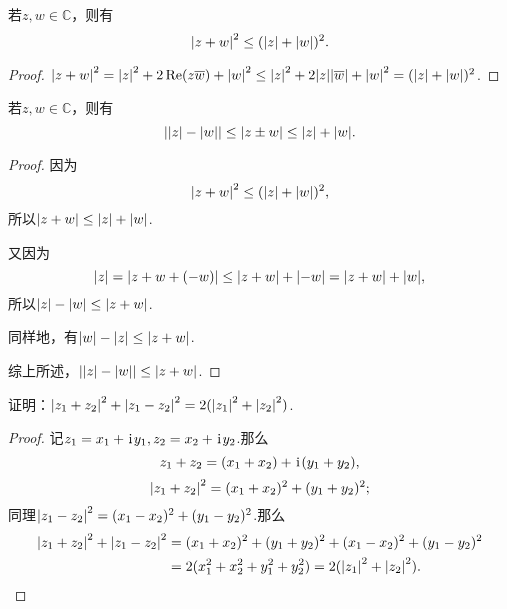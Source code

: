 \begin{theorem}
若\(z,w \in \mathbb{C}\)，则有\begin{equation}
\abs{z + w}^2 \leq (\abs{z} + \abs{w})^2.
\end{equation}
\begin{proof}
\(
\abs{z + w}^2
= \abs{z}^2 + 2 \Re(z \overline{w}) + \abs{w}^2
\leq \abs{z}^2 + 2 \abs{z}\abs{\overline{w}} + \abs{w}^2
= (\abs{z} + \abs{w})^2
\).
\end{proof}
\end{theorem}

\begin{theorem}[三角不等式]
若\(z,w \in \mathbb{C}\)，则有\begin{equation}
\abs{\abs{z}-\abs{w}} \leq \abs{z \pm w} \leq \abs{z} + \abs{w}.
\end{equation}
\begin{proof}
因为\begin{equation*}
\abs{z + w}^2 \leq (\abs{z} + \abs{w})^2,
\end{equation*}所以\(\abs{z + w} \leq \abs{z} + \abs{w}\).

又因为\begin{equation*}
\abs{z} = \abs{z + w + (-w)} \leq \abs{z+w} + \abs{-w} = \abs{z+w} + \abs{w},
\end{equation*}所以\(\abs{z}-\abs{w} \leq \abs{z+w}\).

同样地，有\(\abs{w}-\abs{z} \leq \abs{z+w}\).

综上所述，\(\abs{\abs{z}-\abs{w}}\leq\abs{z+w}\).
\end{proof}
\end{theorem}

\begin{example}
证明：\(\abs{z_1+z_2}^2 + \abs{z_1-z_2}^2 = 2 (\abs{z_1}^2 + \abs{z_2}^2)\).
\begin{proof}
记\(z_1 = x_1 + \kern1pt\mathrm{i}\kern1pt y_1, z_2 = x_2 + \kern1pt\mathrm{i}\kern1pt y_2\).那么\begin{equation*}
z_1+z_2 = (x_1+x_2) + \kern1pt\mathrm{i}\kern1pt(y_1+y_2),
\end{equation*}\begin{equation*}
\abs{z_1+z_2}^2 = (x_1+x_2)^2 + (y_1+y_2)^2;
\end{equation*}同理\(\abs{z_1-z_2}^2 = (x_1-x_2)^2 + (y_1-y_2)^2\).那么\begin{align*}
\abs{z_1+z_2}^2 + \abs{z_1-z_2}^2
&= (x_1+x_2)^2 + (y_1+y_2)^2
+ (x_1-x_2)^2 + (y_1-y_2)^2 \\
&= 2 ( x_1^2 + x_2^2 + y_1^2 + y_2^2 )
= 2 ( \abs{z_1}^2 + \abs{z_2}^2 ).
\qedhere
\end{align*}
\end{proof}
\end{example}

